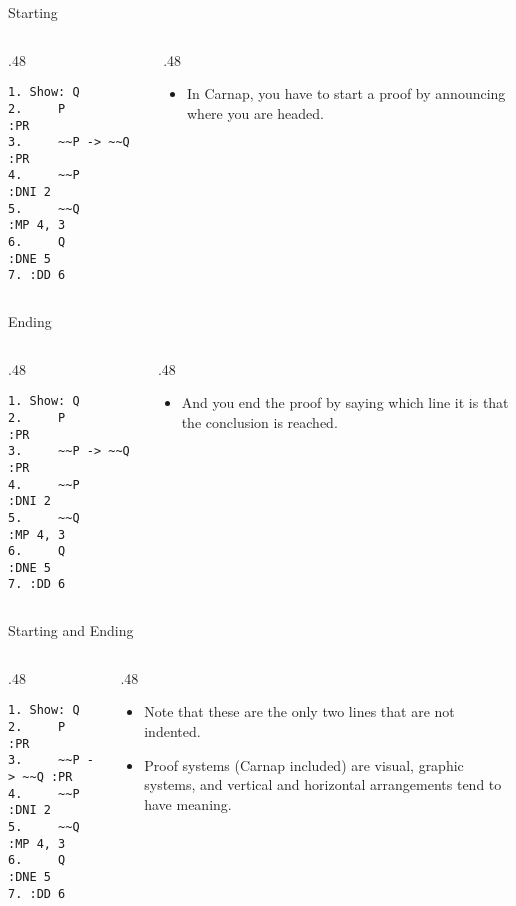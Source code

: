 \documentclass[
  ignorenonframetext,
]{beamer}
\providecommand{\tightlist}{%
  \setlength{\itemsep}{0pt}\setlength{\parskip}{0pt}}
\renewcommand{\,}{\text{, }}
\def\begincols{\begin{columns}}
\def\begincol{\begin{column}}
\def\endcol{\end{column}}
\def\endcols{\end{columns}}
\begin{document}
\begin{frame}[fragile]{Starting}
\protect\hypertarget{starting}{}

\begincols
\begincol{.48\textwidth}

\begin{verbatim}
1. Show: Q
2.     P          :PR
3.     ~~P -> ~~Q :PR
4.     ~~P        :DNI 2
5.     ~~Q        :MP 4, 3
6.     Q          :DNE 5
7. :DD 6
\end{verbatim}

\endcol
\begincol{.48\textwidth}

\begin{itemize}
\tightlist
\item
  In Carnap, you have to start a proof by announcing where you are
  headed.
\end{itemize}

\endcol
\endcols

\end{frame}

\begin{frame}[fragile]{Ending}
\protect\hypertarget{ending}{}

\begincols
\begincol{.48\textwidth}

\begin{verbatim}
1. Show: Q
2.     P          :PR
3.     ~~P -> ~~Q :PR
4.     ~~P        :DNI 2
5.     ~~Q        :MP 4, 3
6.     Q          :DNE 5
7. :DD 6
\end{verbatim}

\endcol
\begincol{.48\textwidth}

\begin{itemize}
\tightlist
\item
  And you end the proof by saying which line it is that the conclusion
  is reached.
\end{itemize}

\endcol
\endcols

\end{frame}

\begin{frame}[fragile]{Starting and Ending}
\protect\hypertarget{starting-and-ending-1}{}

\begincols
\begincol{.48\textwidth}

\begin{verbatim}
1. Show: Q
2.     P          :PR
3.     ~~P -> ~~Q :PR
4.     ~~P        :DNI 2
5.     ~~Q        :MP 4, 3
6.     Q          :DNE 5
7. :DD 6
\end{verbatim}

\endcol
\begincol{.48\textwidth}

\begin{itemize}
\tightlist
\item
  Note that these are the only two lines that are not indented.
\item
  Proof systems (Carnap included) are visual, graphic systems, and
  vertical and horizontal arrangements tend to have meaning.
\end{itemize}

\endcol
\endcols

\end{frame}
\end{document}
